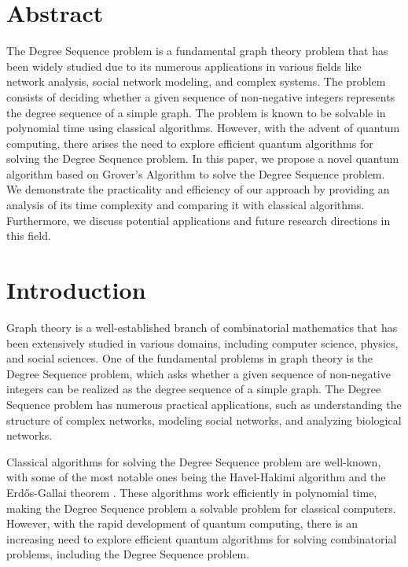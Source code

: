 \section{Abstract}

The Degree Sequence problem is a fundamental graph theory problem that has been widely studied due to its numerous applications in various fields like network analysis, social network modeling, and complex systems. The problem consists of deciding whether a given sequence of non-negative integers represents the degree sequence of a simple graph. The problem is known to be solvable in polynomial time using classical algorithms. However, with the advent of quantum computing, there arises the need to explore efficient quantum algorithms for solving the Degree Sequence problem. In this paper, we propose a novel quantum algorithm based on Grover's Algorithm to solve the Degree Sequence problem. We demonstrate the practicality and efficiency of our approach by providing an analysis of its time complexity and comparing it with classical algorithms. Furthermore, we discuss potential applications and future research directions in this field.

\section{Introduction}

Graph theory is a well-established branch of combinatorial mathematics that has been extensively studied in various domains, including computer science, physics, and social sciences. One of the fundamental problems in graph theory is the Degree Sequence problem, which asks whether a given sequence of non-negative integers can be realized as the degree sequence of a simple graph. The Degree Sequence problem has numerous practical applications, such as understanding the structure of complex networks, modeling social networks, and analyzing biological networks.

Classical algorithms for solving the Degree Sequence problem are well-known, with some of the most notable ones being the Havel-Hakimi algorithm \cite{havel_hakimi} and the Erdős-Gallai theorem \cite{erdos_gallai}. These algorithms work efficiently in polynomial time, making the Degree Sequence problem a solvable problem for classical computers. However, with the rapid development of quantum computing, there is an increasing need to explore efficient quantum algorithms for solving combinatorial problems, including the Degree Sequence problem.

